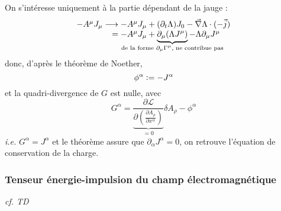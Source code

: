 On s'intéresse uniquement à la partie dépendant de la jauge :
$$
	\begin{array}{r@{\;}l}
		-A^\mu J_\mu \longrightarrow & -A^\mu J_\mu+(\partial_t\Lambda)J_0-\nab\Lambda\cdot(-\vec{j})\\
			=&-A^\mu J_\mu+\underbrace{\partial_\mu(\Lambda J^\mu)}_{\mathclap{\text{de la forme }\partial_\mu\Gamma^\mu\text{, ne contribue pas}}}-\Lambda\partial_\mu J^\mu\\
	\end{array}
$$
donc, d'après le théorème de Noether,
$$
	\phi^\alpha\vcentcolon=-J^\alpha
$$
et la quadri-divergence de $G$ est nulle, avec
$$
	G^\alpha=\underbrace{\frac{\partial \mathcal{L}}{\partial\left(\frac{\partial A_\rho}{\partial x^\alpha}\right)}}_{=0}\delta A_\rho-\phi^\alpha
$$
\emph{i.e.} $G^\alpha=J^\alpha$ et le théorème assure que $\partial_\alpha J^\alpha=0$, on retrouve l'équation de conservation de la charge.

\subsubsection{Tenseur énergie-impulsion du champ électromagnétique}

{\small \it cf. TD}